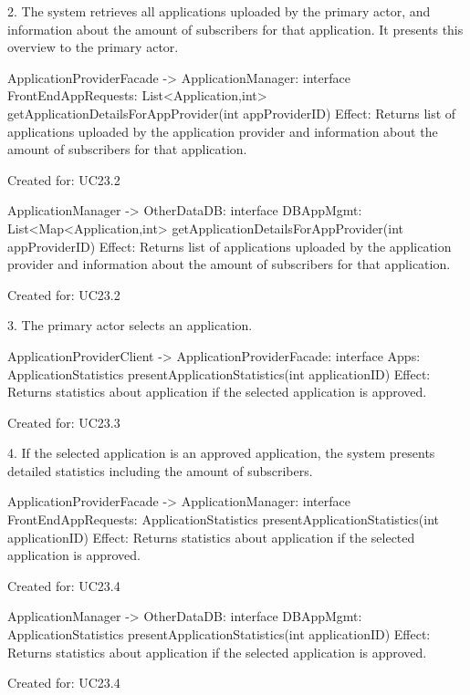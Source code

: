 {{{        2. The system retrieves all applications uploaded by the primary actor, and information about the amount of subscribers for that 
           application. It presents this overview to the primary actor.

            ApplicationProviderFacade -> ApplicationManager: interface FrontEndAppRequests:
                                                List<Application,int> getApplicationDetailsForAppProvider(int appProviderID)
                Effect: Returns list of applications uploaded by the application provider and information about the amount of subscribers    
                        for that application.
                \item Created for: UC23.2
            
            ApplicationManager -> OtherDataDB: interface DBAppMgmt:
                                                List<Map<Application,int> getApplicationDetailsForAppProvider(int appProviderID)
                Effect: Returns list of applications uploaded by the application provider and information about the amount of subscribers    
                        for that application.
                \item Created for: UC23.2

        3. The primary actor selects an application.

            ApplicationProviderClient -> ApplicationProviderFacade: interface Apps: 
                                                    ApplicationStatistics presentApplicationStatistics(int applicationID)
                Effect: Returns statistics about application if the selected application is approved.
                \item Created for: UC23.3

        4. If the selected application is an approved application, the system presents detailed statistics including the amount of 
        subscribers.
        
        ApplicationProviderFacade -> ApplicationManager: interface FrontEndAppRequests: 
                                                    ApplicationStatistics presentApplicationStatistics(int applicationID)
                Effect: Returns statistics about application if the selected application is approved.
                \item Created for: UC23.4
                
        ApplicationManager -> OtherDataDB: interface DBAppMgmt: 
                                                    ApplicationStatistics presentApplicationStatistics(int applicationID)
                Effect: Returns statistics about application if the selected application is approved.
                \item Created for: UC23.4

}}}
